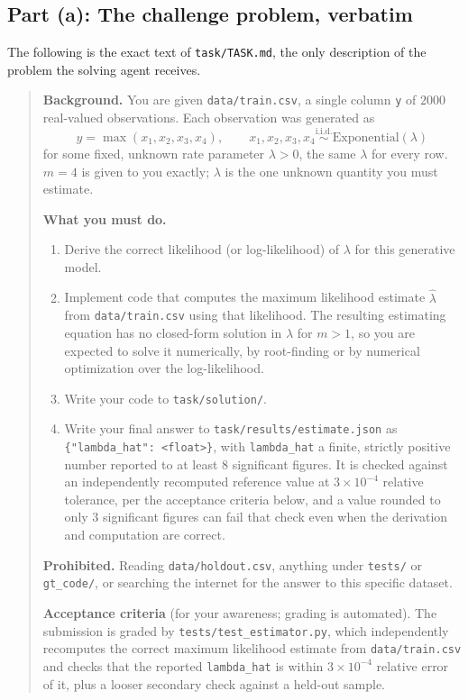 \documentclass[11pt]{article}
\begin{document}
\subsection*{Part (a): The challenge problem, verbatim}

The following is the exact text of \texttt{task/TASK.md}, the only description
of the problem the solving agent receives.

\begin{quote}
\textbf{Background.} You are given \texttt{data/train.csv}, a single column
\texttt{y} of $2000$ real-valued observations. Each observation was generated as
\[
  y = \max(x_1, x_2, x_3, x_4), \qquad x_1,x_2,x_3,x_4 \overset{\text{i.i.d.}}{\sim} \mathrm{Exponential}(\lambda)
\]
for some fixed, unknown rate parameter $\lambda > 0$, the same $\lambda$ for
every row. $m=4$ is given to you exactly; $\lambda$ is the one unknown quantity
you must estimate.

\textbf{What you must do.}
\begin{enumerate}
  \item Derive the correct likelihood (or log-likelihood) of $\lambda$ for this
  generative model.
  \item Implement code that computes the maximum likelihood estimate
  $\hat\lambda$ from \texttt{data/train.csv} using that likelihood. The
  resulting estimating equation has no closed-form solution in $\lambda$ for
  $m>1$, so you are expected to solve it numerically, by root-finding or by
  numerical optimization over the log-likelihood.
  \item Write your code to \texttt{task/solution/}.
  \item Write your final answer to \texttt{task/results/estimate.json} as
  \texttt{\{"lambda\_hat": <float>\}}, with \texttt{lambda\_hat} a finite,
  strictly positive number reported to at least $8$ significant figures. It is
  checked against an independently recomputed reference value at
  $3\times10^{-4}$ relative tolerance, per the acceptance criteria below, and a
  value rounded to only $3$ significant figures can fail that check even when
  the derivation and computation are correct.
\end{enumerate}

\textbf{Prohibited.} Reading \texttt{data/holdout.csv}, anything under
\texttt{tests/} or \texttt{gt\_code/}, or searching the internet for the answer
to this specific dataset.

\textbf{Acceptance criteria} (for your awareness; grading is automated). The
submission is graded by \texttt{tests/test\_estimator.py}, which independently
recomputes the correct maximum likelihood estimate from \texttt{data/train.csv}
and checks that the reported \texttt{lambda\_hat} is within $3\times10^{-4}$
relative error of it, plus a looser secondary check against a held-out sample.
\end{quote}
\end{document}
